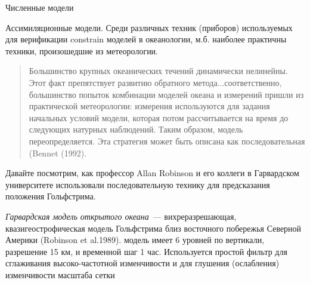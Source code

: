 \begin{chapter}{Численные модели}
\begin{section}{Ассимиляционные модели.}
Среди различных техник (приборов) используемых для верификации
constrain моделей в океанологии, м.б. наиболее практичны техники,
произошедшие из метеорологии.
%
\begin{quote}
Большинство крупных океанических течений динамически нелинейны. Этот
факт препятствует развитию обратного метода...соответственно,
большинство попыток комбинации моделей океана и измерений пришли из
практической метеорологии: измерения используются для задания
начальных условий модели, которая потом рассчитывается на время до
следующих натурных наблюдений. Таким образом, модель
переопределяется. Эта стратегия может быть описана как
последовательная (Bennet (1992).
%
\end{quote}

Давайте посмотрим, как профессор Allan Robinson и его коллеги в
Гарвардском университете использовали последовательную технику для
предсказания положения Гольфстрима.
%

\emph{Гарвардская модель открытого океана}~--- вихреразрешающая,
квазигеострофическая модель Гольфстрима близ восточного побережья
Северной Америки (Robinson et al.1989). модель имеет 6 уровней по
вертикали, разрешение 15 км, и временной шаг 1 час. Используется
простой фильтр для сглаживания высоко-частотной изменчивости и для
глушения (ослабления) изменчивости масштаба сетки
%


\end{section}
\end{chapter}
